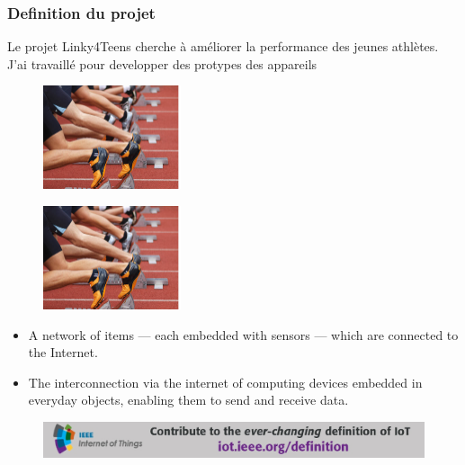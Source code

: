 \documentclass[12pt]{beamer}
\let\olditem\item
\renewcommand\item{\olditem\justifying}
\begin{document}
\begin{frame}
\frametitle{Definition du projet}
Le projet Linky4Teens cherche à améliorer la performance des jeunes athlètes. J'ai travaillé pour developper des protypes des appareils 
	\begin{figure}
		\centering
		\includegraphics[width=0.36\textwidth]{"images/starting_bloc"}
		\label{fig:starting_bloc}
	\end{figure}
	\begin{figure}
		\centering
		\includegraphics[width=0.36\textwidth]{"images/starting_bloc"}
		\label{fig:starting_bloc}
	\end{figure}

\begin{itemize}
	\item A network of items — each embedded with sensors — which are connected to the Internet. 

	\item The interconnection via the internet of computing devices embedded in everyday objects, enabling them to send and receive data. 
\end{itemize}

\begin{figure}
	\centering
	\includegraphics[width=0.9\linewidth]{images/IoTDefinitionsBanner_v2}
	\label{fig:iotdefinitionsbannerv2}
\end{figure}
\end{frame}
\end{document}
